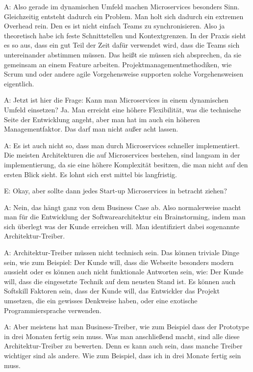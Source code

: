 A: Also gerade im dynamischen Umfeld machen Microservices besonders Sinn. Gleichzeitig entsteht dadurch ein Problem. Man holt sich dadurch ein extremen Overhead rein. Den es ist nicht einfach Teams zu synchronisieren. Also ja theoretisch habe ich feste Schnittstellen und Kontextgrenzen. In der Praxis sieht es so aus, dass ein gut Teil der Zeit dafür verwendet wird, dass die Teams sich untereinander abstimmen müssen. Das heißt sie müssen sich absprechen, da sie gemeinsam an einem Feature arbeiten. Projektmanagementmethodiken, wie Scrum und oder andere agile Vorgehensweise supporten solche Vorgehensweisen eigentlich.

A: Jetzt ist hier die Frage: Kann man Microservices in einem dynamischen Umfeld einsetzen?  Ja. Man erreicht eine höhere Flexibilität, was die technische Seite der Entwicklung angeht, aber man hat im auch ein höheren Managementfaktor. Das darf man nicht außer acht lassen.

A: Es ist auch nicht so, dass man durch Microservices schneller implementiert. Die meisten Architekturen die auf Microservices bestehen, sind langsam in der implementierung, da sie eine höhere Komplexität besitzen, die man nicht auf den ersten Blick sieht. Es lohnt sich erst mittel bis langfristig.

E: Okay, aber sollte dann jedes Start-up Microservices in betracht ziehen?

A: Nein, das hängt ganz von dem Business Case ab. Also normalerweise macht man für die Entwicklung der Softwarearchitektur ein Brainstorming, indem man sich überlegt was der Kunde erreichen will. Man identifiziert dabei sogenannte Architektur-Treiber.

A: Architektur-Treiber müssen nicht technisch sein. Das können triviale Dinge sein, wie zum Beispiel: Der Kunde will, dass die Webseite besonders modern aussieht oder es können auch nicht funktionale Antworten sein, wie: Der Kunde will, dass die eingesetzte Technik auf dem neusten Stand ist. Es können auch Softskill Faktoren sein, dass der Kunde will, das Entwickler das Projekt umsetzen, die ein gewisses Denkweise haben, oder eine exotische Programmiersprache verwenden. 

A: Aber meistens hat man Business-Treiber, wie zum Beispiel dass der Prototype in drei Monaten fertig sein muss. Was man anschließend macht, sind alle diese Architektur-Treiber zu bewerten. Denn es kann auch sein, dass manche Treiber wichtiger sind als andere. Wie zum Beispiel, dass ich in drei Monate fertig sein muss. 

